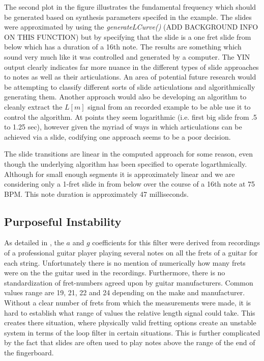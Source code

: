 \documentclass[../main.tex]{subfiles}
\begin{document}
The second plot in the figure illustrates the fundamental frequency which should be generated based on synthesis parameters specifed in the example. The slides were approximated by using the \emph{generateLCurve()} (ADD BACKGROUND INFO ON THIS FUNCTION) but by specifying that the slide is a one fret slide from below which has a duration of a 16th note. The results are something which sound very much like it was controlled and generated by a computer. The YIN output clearly indicates far more nuance in the different types of slide  approaches to notes as well as their articulations. An area of potential future research would be attempting to classify different sorts of slide articulations and algorithmically generating them. Another approach would also be developing an algorithm to cleanly extract the $L[m]$ signal from an recorded example to be able use it to control the algorithm. At points they seem logarithmic (i.e. first big slide from .5 to 1.25 sec), however given the myriad of ways in which articulations can be achieved via a slide, codifying one approach seems to be a poor decision.

The slide transitions are linear in the computed approach for some reason, even though the underlying algorithm has been specified to operate logarthmically. Although for small enough segments it is approximately linear and we are considering only a 1-fret slide in
from below over the course of a 16th note at 75 BPM. This note duration is approximately 47 milliseconds.

\subsection{Purposeful Instability}
As detailed in , the $a$ and $g$ coefficients for this filter were derived from recordings of a professional guitar player playing several notes on all the frets of a guitar for each string. Unfortunately there is no mention of numerically how many frets were on the the guitar used in the recordings. Furthermore, there is no standardization of fret-numbers agreed upon by guitar manufacturers. Common values range are 19, 21, 22 and 24 depending on the make and manufacturer. Without a clear number of frets from which the measurements were made, it is hard to establish what range of values the relative length signal could take. This creates there situation, where physically valid fretting options create an unstable system in terms of the loop filter in certain situations. This is further complicated by the fact that slides are often used to play notes above the range of the end of the fingerboard.
\end{document}
